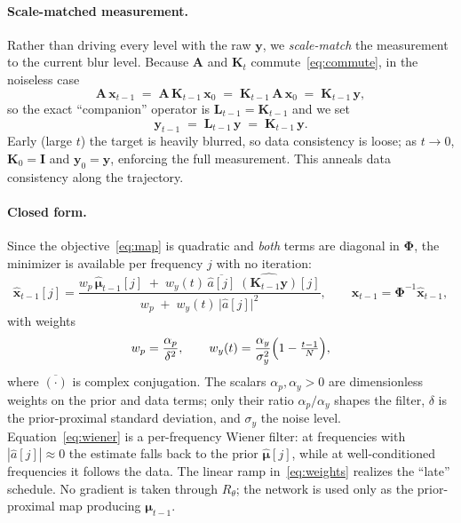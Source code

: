 \documentclass[11pt]{article}
\newcommand{\bm}[1]{\boldsymbol{#1}}  %
\newcommand{\Phimat}{\bm{\Phi}}
\newcommand{\A}{\mathbf{A}}
\newcommand{\K}{\mathbf{K}}
\newcommand{\x}{\mathbf{x}}
\newcommand{\y}{\mathbf{y}}
\newcommand{\bmu}{\bm{\mu}}
\newcommand{\I}{\mathbf{I}}
\begin{document}
\paragraph{Scale-matched measurement.}
Rather than driving every level with the raw $\y$, we \emph{scale-match} the measurement
to the current blur level. Because $\A$ and $\K_t$ commute~\eqref{eq:commute}, in the
noiseless case
\begin{equation}
\A\,\x_{t-1}\;=\;\A\,\K_{t-1}\,\x_0\;=\;\K_{t-1}\,\A\,\x_0\;=\;\K_{t-1}\,\y ,
\end{equation}
so the exact ``companion'' operator is $\mathbf{L}_{t-1}=\K_{t-1}$ and we set
\begin{equation}
\y_{t-1}\;=\;\mathbf{L}_{t-1}\,\y\;=\;\K_{t-1}\,\y .
\label{eq:scalematch}
\end{equation}
Early (large $t$) the target is heavily blurred, so data consistency is loose; as
$t\!\to\!0$, $\K_0=\I$ and $\y_0=\y$, enforcing the full measurement. This anneals data
consistency along the trajectory.

\paragraph{Closed form.}
Since the objective~\eqref{eq:map} is quadratic and \emph{both} terms are diagonal in
$\Phimat$,
the minimizer is available per frequency $j$ with no iteration:
\begin{equation}
\boxed{\;
\hat{\x}_{t-1}[j]
=\frac{w_p\,\hat{\bmu}_{t-1}[j]\;+\;w_y(t)\,\overline{\hat{a}[j]}\;\widehat{(\K_{t-1}\y)}[j]}
       {w_p\;+\;w_y(t)\,\lvert\hat{a}[j]\rvert^{2}} ,
\qquad \x_{t-1}=\Phimat^{-1}\hat{\x}_{t-1},
\;}
\label{eq:wiener}
\end{equation}
with weights
\begin{equation}
w_p=\frac{\alpha_p}{\delta^{2}},\qquad
w_y(t)=\frac{\alpha_y}{\sigma_y^{2}}\Bigl(1-\tfrac{t-1}{N}\Bigr),
\label{eq:weights}
\end{equation}
where $\overline{(\cdot)}$ is complex conjugation. The scalars $\alpha_p,\alpha_y>0$ are
dimensionless weights on the prior and data terms; only their ratio $\alpha_p/\alpha_y$ shapes the filter,
$\delta$ is the prior-proximal standard deviation, and $\sigma_y$ the noise level.
Equation~\eqref{eq:wiener} is a per-frequency Wiener filter:
at frequencies with $|\hat a[j]|\!\approx\!0$
the estimate falls back to the prior $\hat{\bmu}[j]$, while at well-conditioned
frequencies it follows the data. The linear ramp in~\eqref{eq:weights} realizes the
``late'' schedule. No gradient is taken through
$R_\theta$; the network is used only as the prior-proximal map producing $\bmu_{t-1}$.
\end{document}
